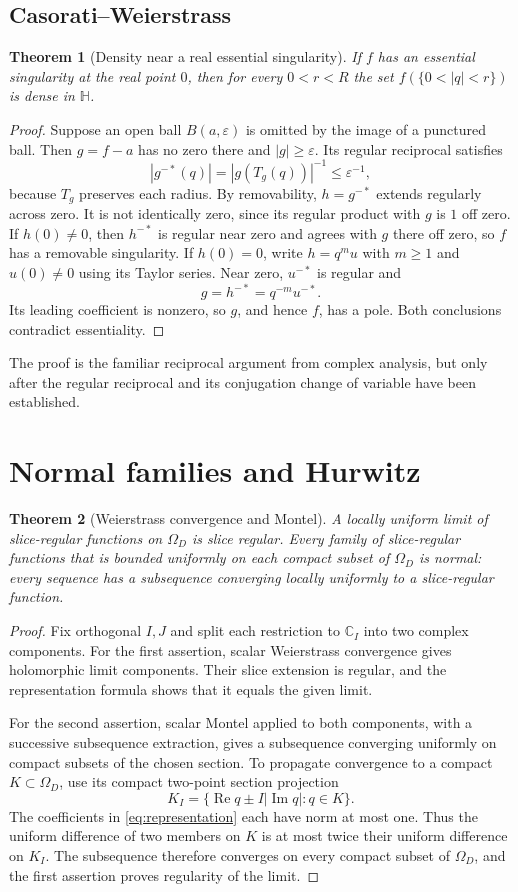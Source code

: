\documentclass[11pt,a4paper]{article}
\numberwithin{equation}{section}
\newtheorem{theorem}{Theorem}[section]
\theoremstyle{definition}
\theoremstyle{remark}
\newcommand{\C}{\mathbb C}
\newcommand{\HH}{\mathbb H}
\newcommand{\Rea}{\operatorname{Re}}
\newcommand{\Ima}{\operatorname{Im}}
\begin{document}
\subsection{Casorati--Weierstrass}
\begin{theorem}[Density near a real essential singularity]
\label{thm:casorati}
If $f$ has an essential singularity at the real point $0$, then for every
$0<r<R$ the set $f(\{0<|q|<r\})$ is dense in $\HH$.
\end{theorem}
\begin{proof}
Suppose an open ball $B(a,\varepsilon)$ is omitted by the image of a punctured
ball. Then $g=f-a$ has no zero there and $|g|\ge\varepsilon$.
Its regular reciprocal satisfies
\[
 |g^{-*}(q)|=|g(T_g(q))|^{-1}\le\varepsilon^{-1},
\]
because $T_g$ preserves each radius. By removability, $h=g^{-*}$ extends
regularly across zero. It is not identically zero, since its regular product
with $g$ is $1$ off zero.
If $h(0)\ne0$, then $h^{-*}$ is regular near zero and agrees with $g$
there off zero, so $f$ has a removable singularity.
If $h(0)=0$, write $h=q^m u$ with $m\ge1$ and $u(0)\ne0$ using its Taylor
series. Near zero, $u^{-*}$ is regular and
\[
 g=h^{-*}=q^{-m}u^{-*}.
\]
Its leading coefficient is nonzero, so $g$, and hence $f$, has a pole.
Both conclusions contradict essentiality.
\end{proof}
The proof is the familiar reciprocal argument from complex analysis, but
only after the regular reciprocal and its conjugation change of variable
have been established.

\section{Normal families and Hurwitz}
\label{sec:normal}
\begin{theorem}[Weierstrass convergence and Montel]
\label{thm:montel}
A locally uniform limit of slice-regular functions on $\Omega_D$ is slice
regular. Every family of slice-regular functions that is bounded uniformly
on each compact subset of $\Omega_D$ is normal: every sequence has a
subsequence converging locally uniformly to a slice-regular function.
\end{theorem}
\begin{proof}
Fix orthogonal $I,J$ and split each restriction to $\C_I$ into two complex
components. For the first assertion, scalar Weierstrass convergence gives
holomorphic limit components. Their slice extension is regular, and the
representation formula shows that it equals the given limit.

For the second assertion, scalar Montel applied to both components, with a
successive subsequence extraction, gives a subsequence converging uniformly
on compact subsets of the chosen section. To propagate convergence to a
compact $K\subset\Omega_D$, use its compact two-point section projection
\[
 K_I=\{\Rea q\pm I|\Ima q|:q\in K\}.
\]
The coefficients in \eqref{eq:representation} each have norm at most one.
Thus the uniform difference of two members on $K$ is at most twice their
uniform difference on $K_I$. The subsequence therefore converges on every
compact subset of $\Omega_D$, and the first assertion proves regularity of
the limit.
\end{proof}
\end{document}
